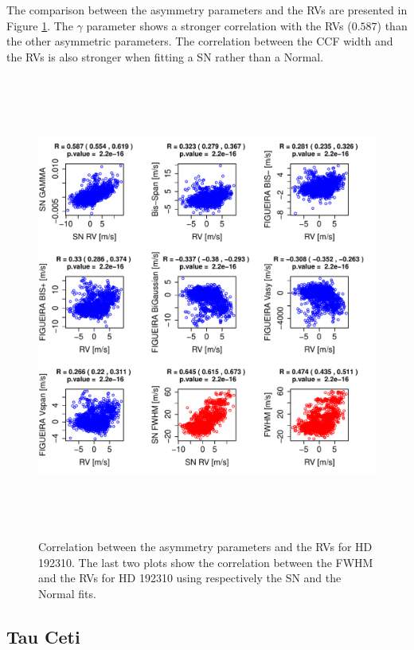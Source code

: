 \documentclass[11pt, oneside]{article}
\begin{document}
The comparison between the asymmetry parameters and the RVs are presented in Figure \ref{fig:Gliese785:corrPlot}. The $\gamma$ parameter shows a stronger correlation with the RVs ($0.587$) than the other asymmetric parameters. The correlation between the CCF width and the RVs is also stronger when fitting a SN rather than a Normal.
%
\begin{figure}[htbp]
   \centering
\includegraphics[height = 6in]{HD19231_[4]Comparison_para.pdf} 
   \caption{Correlation between the asymmetry parameters and the RVs for HD 192310. The last two plots show the correlation between the FWHM and the RVs for HD 192310 using respectively the SN and the Normal fits.}
   \label{fig:Gliese785:corrPlot}
\end{figure}

\subsection{Tau Ceti}  \label{sec:Taucet}
\end{document}
